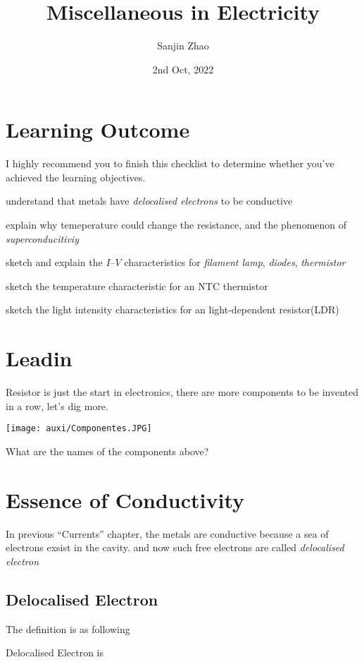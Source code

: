 \documentclass[a4paper]{tufte-handout}
\title{Miscellaneous in Electricity}
\author{Sanjin Zhao}
\date{2nd Oct, 2022}  %
\newenvironment{SummBox}
{\begin{tcolorbox}[breakable,colback=r1!30,colframe=r1,title=Summary]} {\end{tcolorbox}}
\begin{document}
\maketitle%
\section*{Learning Outcome}
I highly recommend you to finish this checklist to determine whether you've achieved the learning objectives.
\begin{todolist}
  \item understand that metals have \emph{delocalised electrons} to be conductive
  \item explain why temeperature could change the resistance, and the phenomenon of \emph{superconducitiviy}
  \item sketch and explain the $I$–$V$ characteristics for \emph{filament lamp}, \emph{diodes}, \emph{thermistor}
  \item sketch the temperature characteristic for an NTC thermistor
  \item sketch the light intensity characteristics for an light-dependent resistor(LDR)
\end{todolist}
\clearpage

\section{Leadin}
Resistor is just the start in electronics, there are more components to be invented in a row, let's dig more. 
\begin{marginfigure}
\texttt{[image: auxi/Componentes.JPG]}
\caption{What are the names of the components above?}
\end{marginfigure}

\section{Essence of Conductivity}
In previous ``Currents'' chapter, the metals are conductive because a sea of electrons exsist in the cavity. and now such free electrons are called \emph{delocalised electron}

\subsection{Delocalised Electron}
The definition is as following
\begin{SummBox}
Delocalised Electron is
\vspace{0.5in}
\end{SummBox}
\end{document}
